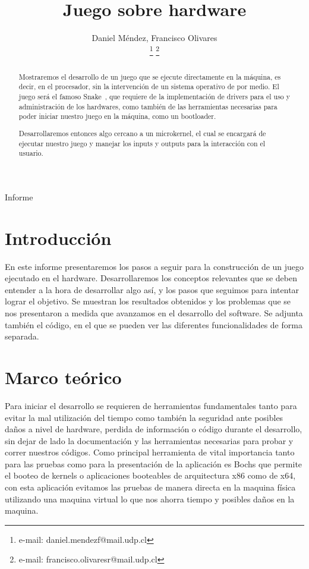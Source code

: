 \documentclass[twocolumn,11pts]{IEEEtran}
\begin{document}
\let\orilabel\label


\title{Juego sobre hardware}


\author{Daniel Méndez, Francisco Olivares

\thanks{e-mail: daniel.mendezf@mail.udp.cl}
\thanks{e-mail: francisco.olivaresr@mail.udp.cl}
}

{Informe}

\maketitle


\begin{abstract}
 Mostraremos el desarrollo de un juego que se ejecute directamente en la máquina, es decir, en el procesador, sin la intervención de un sistema operativo de por medio. El juego será el famoso Snake~\cite{snake}, que requiere de la implementación de drivers para el uso y administración de los hardwares, como también de las herramientas necesarias para poder iniciar nuestro juego en la máquina, como un bootloader. 

Desarrollaremos entonces algo cercano a un microkernel, el cual se encargará de ejecutar nuestro juego y manejar los inputs y outputs para la interacción con el usuario. \end{abstract}

\section{Introducción}
En este informe presentaremos los pasos a seguir para la construcción de un juego ejecutado en el hardware.
Desarrollaremos los conceptos relevantes que se deben entender a la hora de desarrollar algo así, y los pasos que seguimos para intentar lograr el objetivo.
Se muestran los resultados obtenidos y los problemas que se nos presentaron a medida que avanzamos en el desarrollo del software.
Se adjunta también el código, en el que se pueden ver las diferentes funcionalidades de forma separada.

\section{Marco teórico}
    Para iniciar el desarrollo se requieren de herramientas fundamentales tanto para evitar la mal utilización del tiempo como también la seguridad ante posibles daños a nivel de hardware, perdida de información o código durante el desarrollo, sin dejar de lado la documentación y las herramientas necesarias para probar y correr nuestros códigos. Como principal herramienta de vital importancia tanto para las pruebas como para la presentación de la aplicación es Bochs\cite{bochs} que permite el booteo de kernels o aplicaciones booteables de arquitectura x86 como de x64, con esta aplicación evitamos las pruebas de manera directa en la maquina física utilizando una maquina virtual lo que nos ahorra tiempo y posibles daños en la maquina.
\end{document}
